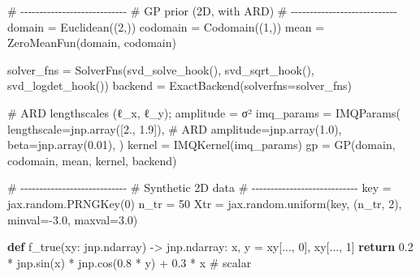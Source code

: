 \documentclass[
  letterpaper,
  DIV=11,
  numbers=noendperiod]{scrartcl}
\newenvironment{Shaded}{\begin{snugshade}}{\end{snugshade}}
\newcommand{\CommentTok}[1]{\textcolor[rgb]{0.37,0.37,0.37}{#1}}
\newcommand{\ControlFlowTok}[1]{\textcolor[rgb]{0.00,0.23,0.31}{\textbf{#1}}}
\newcommand{\DecValTok}[1]{\textcolor[rgb]{0.68,0.00,0.00}{#1}}
\newcommand{\FloatTok}[1]{\textcolor[rgb]{0.68,0.00,0.00}{#1}}
\newcommand{\KeywordTok}[1]{\textcolor[rgb]{0.00,0.23,0.31}{\textbf{#1}}}
\newcommand{\NormalTok}[1]{\textcolor[rgb]{0.00,0.23,0.31}{#1}}
\newcommand{\OperatorTok}[1]{\textcolor[rgb]{0.37,0.37,0.37}{#1}}
\begin{document}
\begin{Shaded}
\begin{Highlighting}[]
\CommentTok{\# {-}{-}{-}{-}{-}{-}{-}{-}{-}{-}{-}{-}{-}{-}{-}{-}{-}{-}{-}{-}{-}{-}{-}{-}{-}{-}{-}{-}}
\CommentTok{\# GP prior (2D, with ARD)}
\CommentTok{\# {-}{-}{-}{-}{-}{-}{-}{-}{-}{-}{-}{-}{-}{-}{-}{-}{-}{-}{-}{-}{-}{-}{-}{-}{-}{-}{-}{-}}
\NormalTok{domain   }\OperatorTok{=}\NormalTok{ Euclidean((}\DecValTok{2}\NormalTok{,))}
\NormalTok{codomain }\OperatorTok{=}\NormalTok{ Codomain((}\DecValTok{1}\NormalTok{,))}
\NormalTok{mean     }\OperatorTok{=}\NormalTok{ ZeroMeanFun(domain, codomain)}

\NormalTok{solver\_fns }\OperatorTok{=}\NormalTok{ SolverFns(svd\_solve\_hook(), svd\_sqrt\_hook(), svd\_logdet\_hook())}
\NormalTok{backend }\OperatorTok{=}\NormalTok{ ExactBackend(solverfns}\OperatorTok{=}\NormalTok{solver\_fns)}

\CommentTok{\# ARD lengthscales (ℓ\_x, ℓ\_y); amplitude = σ²}
\NormalTok{imq\_params }\OperatorTok{=}\NormalTok{ IMQParams(}
\NormalTok{    lengthscale}\OperatorTok{=}\NormalTok{jnp.array([}\FloatTok{2.}\NormalTok{, }\FloatTok{1.9}\NormalTok{]),  }\CommentTok{\# ARD}
\NormalTok{    amplitude}\OperatorTok{=}\NormalTok{jnp.array(}\FloatTok{1.0}\NormalTok{),}
\NormalTok{    beta}\OperatorTok{=}\NormalTok{jnp.array(}\FloatTok{0.01}\NormalTok{),}
\NormalTok{)}
\NormalTok{kernel  }\OperatorTok{=}\NormalTok{ IMQKernel(imq\_params)}
\NormalTok{gp      }\OperatorTok{=}\NormalTok{ GP(domain, codomain, mean, kernel, backend)}

\CommentTok{\# {-}{-}{-}{-}{-}{-}{-}{-}{-}{-}{-}{-}{-}{-}{-}{-}{-}{-}{-}{-}{-}{-}{-}{-}{-}{-}{-}{-}}
\CommentTok{\# Synthetic 2D data}
\CommentTok{\# {-}{-}{-}{-}{-}{-}{-}{-}{-}{-}{-}{-}{-}{-}{-}{-}{-}{-}{-}{-}{-}{-}{-}{-}{-}{-}{-}{-}}
\NormalTok{key }\OperatorTok{=}\NormalTok{ jax.random.PRNGKey(}\DecValTok{0}\NormalTok{)}
\NormalTok{n\_tr }\OperatorTok{=} \DecValTok{50}
\NormalTok{Xtr }\OperatorTok{=}\NormalTok{ jax.random.uniform(key, (n\_tr, }\DecValTok{2}\NormalTok{), minval}\OperatorTok{={-}}\FloatTok{3.0}\NormalTok{, maxval}\OperatorTok{=}\FloatTok{3.0}\NormalTok{)}

\KeywordTok{def}\NormalTok{ f\_true(xy: jnp.ndarray) }\OperatorTok{{-}\textgreater{}}\NormalTok{ jnp.ndarray:}
\NormalTok{    x, y }\OperatorTok{=}\NormalTok{ xy[..., }\DecValTok{0}\NormalTok{], xy[..., }\DecValTok{1}\NormalTok{]}
    \ControlFlowTok{return} \FloatTok{0.2} \OperatorTok{*}\NormalTok{ jnp.sin(x) }\OperatorTok{*}\NormalTok{ jnp.cos(}\FloatTok{0.8} \OperatorTok{*}\NormalTok{ y) }\OperatorTok{+} \FloatTok{0.3} \OperatorTok{*}\NormalTok{ x  }\CommentTok{\# scalar}


\end{Highlighting}
\end{Shaded}
\end{document}
